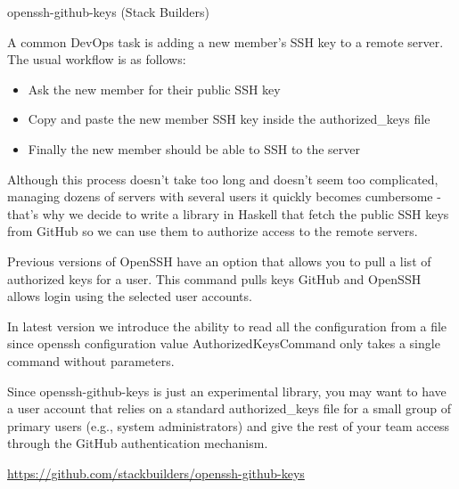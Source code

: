\documentclass[DIV16,twocolumn,10pt]{scrreprt}
\begin{document}
\begin{hcarentry}{openssh-github-keys (Stack Builders)}
\makeheader

A common DevOps task is adding a new member’s SSH key to a remote server. The
usual workflow is as follows:

\begin{itemize}
  \item Ask the new member for their public SSH key
  \item Copy and paste the new member SSH key inside the authorized_keys file
  \item Finally the new member should be able to SSH to the server
\end{itemize}

Although this process doesn't take too long and doesn't seem too complicated,
managing dozens of servers with several users it quickly becomes cumbersome -
that's why we decide to write a library in Haskell that fetch the public SSH
keys from GitHub so we can use them to authorize access to the remote servers.

Previous versions of OpenSSH have an option that allows you to pull a list of
authorized keys for a user. This command pulls keys GitHub and OpenSSH allows
login using the selected user accounts.

In latest version we introduce the ability to read all the configuration from a
file since openssh configuration value AuthorizedKeysCommand only takes a
single command without parameters.

Since openssh-github-keys is just an experimental library, you may want to have
a user account that relies on a standard authorized_keys file for a small group
of primary users (e.g., system administrators) and give the rest of your team
access through the GitHub authentication mechanism.

\FurtherReading
  \url{https://github.com/stackbuilders/openssh-github-keys}
\end{hcarentry}
\end{document}
